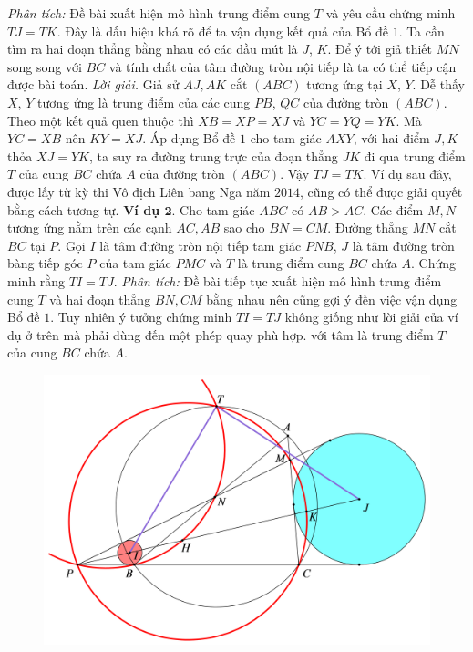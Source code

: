 \begin{multicols}{2}
	\textit{Phân tích:} Đề bài xuất hiện mô hình trung điểm cung $T$ và yêu cầu chứng minh $TJ=TK$. Đây là dấu hiệu khá rõ để ta vận dụng kết quả của Bổ đề $1$. Ta cần tìm ra hai đoạn thẳng bằng nhau có các đầu mút là $J$, $K$. Để ý tới giả thiết $MN$ song song với $BC$ và tính chất của tâm đường tròn nội tiếp là ta có thể tiếp cận được bài toán.
	\vskip 0.1cm
	\textit{Lời giải.} Giả sử $AJ,AK$ cắt $(ABC)$ tương ứng tại $X$, $Y$. Dễ thấy $X$, $Y$ tương ứng là trung điểm của các cung $PB$, $QC$ của đường tròn $(ABC)$. Theo một kết quả quen thuộc thì $XB=XP=XJ$ và  $YC=YQ=YK$. Mà $YC=XB$ nên $KY=XJ$. Áp dụng Bổ đề $1$ cho tam giác $AXY$, với hai điểm $J,K$ thỏa $XJ=YK$, ta suy ra đường trung trực của đoạn thẳng $JK$ đi qua trung điểm $T$ của cung $BC$ chứa $A$ của đường tròn $(ABC)$. Vậy $TJ=TK$.
	\vskip 0.1cm
	Ví dụ sau đây, được lấy từ kỳ thi Vô địch Liên bang Nga năm $2014$, cũng có thể được giải quyết bằng cách tương tự.
	\vskip 0.1cm
	\textbf{\color{diendantoanhoc}Ví dụ $\pmb{2.}$} Cho tam giác $ABC$ có $AB > AC$. Các điểm $M,N$ tương ứng nằm trên các cạnh $AC,AB$ sao cho $BN=CM$. Đường thẳng $MN$ cắt $BC$ tại $P$. Gọi $I$ là tâm đường tròn nội tiếp tam giác $PNB$, $J$ là tâm đường tròn bàng tiếp góc $P$ của tam giác $PMC$ và $T$ là trung điểm cung $BC$ chứa $A$. Chứng minh rằng  $TI=TJ$.
	\vskip 0.1cm
	\textit{Phân tích:} Đề bài tiếp tục xuất hiện mô hình trung điểm cung $T$ và hai đoạn thẳng $BN,CM$ bằng nhau nên cũng gợi ý đến việc vận dụng Bổ đề $1$. Tuy nhiên ý tưởng chứng minh $TI=TJ$ không giống như lời giải của ví dụ ở trên mà phải dùng đến một phép quay phù hợp. với tâm là trung điểm $T$ của cung $BC$ chứa $A$.
	\begin{figure}[H]
		\vspace*{-5pt}
		\centering
		\captionsetup{labelformat= empty, justification=centering}
		\includegraphics[width= 1\linewidth]{5}

\end{figure}
\end{multicols}
